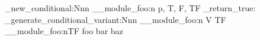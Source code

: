 \prg_new_conditional:Nnn
  \__module_foo:n
  { p, T, F, TF }
  { \prg_return_true: }
\prg_generate_conditional_variant:Nnn  %
  \__module_foo:n
  { V }
  { TF }
\__module_foo:nTF
  { foo }
  { bar }
  { baz }
